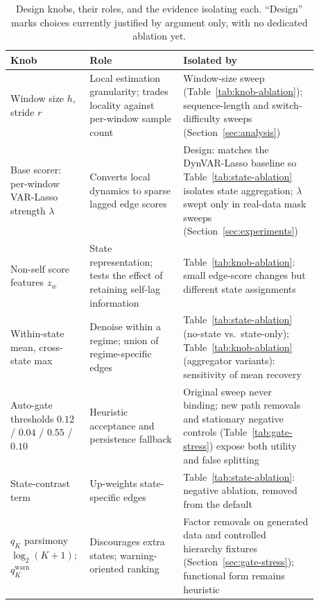 \documentclass[sigconf,anonymous]{acmart}
\begin{document}
\begin{table}[t]
\caption{Design knobs, their roles, and the evidence isolating each. ``Design'' marks choices currently justified by argument only, with no dedicated ablation yet.}
\label{tab:knob-map}
\centering
\small
{\sloppy
\setlength{\tabcolsep}{4pt}\begin{tabular}{p{0.22\linewidth}p{0.28\linewidth}p{0.38\linewidth}}
\toprule
Knob & Role & Isolated by \\
\midrule
Window size $h$, stride $r$ & Local estimation granularity; trades locality against per-window sample count & Window-size sweep (Table~\ref{tab:knob-ablation}); sequence-length and switch-difficulty sweeps (Section~\ref{sec:analysis}) \\
Base scorer: per-window VAR-Lasso strength $\lambda$ & Converts local dynamics to sparse lagged edge scores & Design: matches the DynVAR-Lasso baseline so Table~\ref{tab:state-ablation} isolates state aggregation; $\lambda$ swept only in real-data mask sweeps (Section~\ref{sec:experiments}) \\
Non-self score features $z_w$ & State representation; tests the effect of retaining self-lag information & Table~\ref{tab:knob-ablation}: small edge-score changes but different state assignments \\
Within-state mean, cross-state max & Denoise within a regime; union of regime-specific edges & Table~\ref{tab:state-ablation} (no-state vs.\ state-only); Table~\ref{tab:knob-ablation} (aggregator variants): sensitivity of mean recovery \\
Auto-gate thresholds $0.12$ / $0.04$ / $0.55$ / $0.10$ & Heuristic acceptance and persistence fallback & Original sweep never binding; new path removals and stationary negative controls (Table~\ref{tab:gate-stress}) expose both utility and false splitting \\
State-contrast term & Up-weights state-specific edges & Table~\ref{tab:state-ablation}: negative ablation, removed from the default \\
$q_K$ parsimony $\log_2(K{+}1)$; $q^{\mathrm{warn}}_K$ & Discourages extra states; warning-oriented ranking & Factor removals on generated data and controlled hierarchy fixtures (Section~\ref{sec:gate-stress}); functional form remains heuristic \\
\bottomrule
\end{tabular}}
\end{table}
\end{document}
